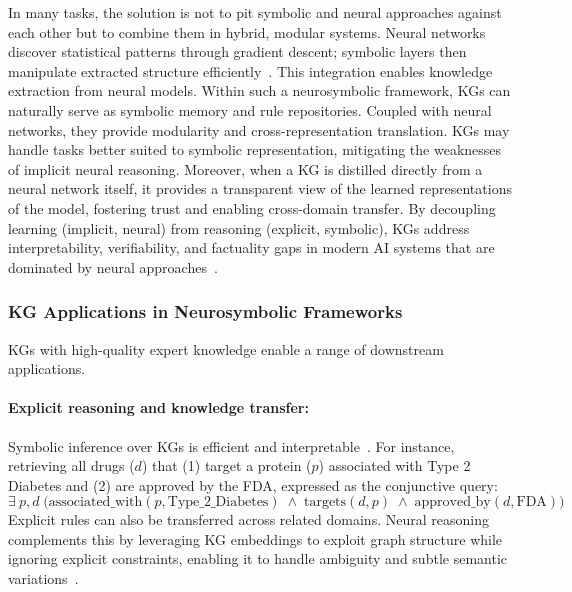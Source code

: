 \documentclass[10pt]{article}
\begin{document}
In many tasks, the solution is not to pit symbolic and neural approaches against each other but to combine them in hybrid, modular systems. Neural networks discover statistical patterns through gradient descent; symbolic layers then manipulate extracted structure efficiently~\cite{neurosymboic_3rd}. This integration enables knowledge extraction from neural models. Within such a neurosymbolic framework, KGs can naturally serve as symbolic memory and rule repositories. Coupled with neural networks, they provide modularity and cross-representation translation. KGs may handle tasks better suited to symbolic representation, mitigating the weaknesses of implicit neural reasoning. Moreover, when a KG is distilled directly from a neural network itself, it provides a transparent view of the learned representations of the model, fostering trust and enabling cross-domain transfer.
By decoupling learning (implicit, neural) from reasoning (explicit, symbolic), KGs address interpretability, verifiability, and factuality gaps in modern AI systems that are dominated by neural approaches~\cite{besold2017neuralsymbolic}. 

\subsubsection{KG Applications in Neurosymbolic Frameworks}
\label{subsubsec:kg_applications}
KGs with high-quality expert knowledge enable a range of downstream applications. 

\paragraph{Explicit reasoning and knowledge transfer:} Symbolic inference over KGs is efficient and interpretable~\cite{ns_methods_kg_reasoning}. For instance, retrieving all drugs ($d$) that (1) target a protein ($p$) associated with Type 2 Diabetes and (2) are approved by the FDA, expressed as the conjunctive query:
\begin{equation}
\exists\ p, d \;
\big(
    \text{associated\_with}(p, \text{Type\_2\_Diabetes}) \;
    \wedge \;
    \text{targets}(d, p) \;
    \wedge \;
    \text{approved\_by}(d, \text{FDA})
\big)
\end{equation}
Explicit rules can also be transferred across related domains. Neural reasoning complements this by leveraging KG embeddings to exploit graph structure while ignoring explicit constraints, enabling it to handle ambiguity and subtle semantic variations~\cite{ZHANG202114}. 
 
\end{document}
